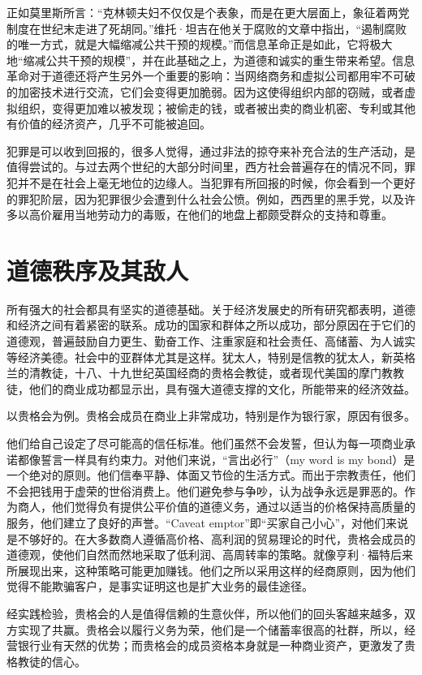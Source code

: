 正如莫里斯所言：“克林顿夫妇不仅仅是个表象，而是在更大层面上，象征着两党制度在世纪末走进了死胡同。”维托·坦吉在他关于腐败的文章中指出，“遏制腐败的唯一方式，就是大幅缩减公共干预的规模。”而信息革命正是如此，它将极大地“缩减公共干预的规模”，并在此基础之上，为道德和诚实的重生带来希望。信息革命对于道德还将产生另外一个重要的影响：当网络商务和虚拟公司都用牢不可破的加密技术进行交流，它们会变得更加脆弱。因为这使得组织内部的窃贼，或者虚拟组织，变得更加难以被发现；被偷走的钱，或者被出卖的商业机密、专利或其他有价值的经济资产，几乎不可能被追回。

犯罪是可以收到回报的，很多人觉得，通过非法的掠夺来补充合法的生产活动，是值得尝试的。与过去两个世纪的大部分时间里，西方社会普遍存在的情况不同，罪犯并不是在社会上毫无地位的边缘人。当犯罪有所回报的时候，你会看到一个更好的罪犯阶层，因为犯罪很少会遭到什么社会公愤。例如，西西里的黑手党，以及许多以高价雇用当地劳动力的毒贩，在他们的地盘上都颇受群众的支持和尊重。

\section{道德秩序及其敌人}
所有强大的社会都具有坚实的道德基础。关于经济发展史的所有研究都表明，道德和经济之间有着紧密的联系。成功的国家和群体之所以成功，部分原因在于它们的道德观，普遍鼓励自力更生、勤奋工作、注重家庭和社会责任、高储蓄、为人诚实等经济美德。社会中的亚群体尤其是这样。犹太人，特别是信教的犹太人，新英格兰的清教徒，十八、十九世纪英国经商的贵格会教徒，或者现代美国的摩门教教徒，他们的商业成功都显示出，具有强大道德支撑的文化，所能带来的经济效益。

以贵格会为例。贵格会成员在商业上非常成功，特别是作为银行家，原因有很多。

他们给自己设定了尽可能高的信任标准。他们虽然不会发誓，但认为每一项商业承诺都像誓言一样具有约束力。对他们来说，“言出必行”（my word is my bond）是一个绝对的原则。他们信奉平静、体面又节俭的生活方式。而出于宗教责任，他们不会把钱用于虚荣的世俗消费上。他们避免参与争吵，认为战争永远是罪恶的。作为商人，他们觉得负有提供公平价值的道德义务，通过以适当的价格保持高质量的服务，他们建立了良好的声誉。“Caveat emptor”即“买家自己小心”，对他们来说是不够好的。在大多数商人遵循高价格、高利润的贸易理论的时代，贵格会成员的道德观，使他们自然而然地采取了低利润、高周转率的策略。就像亨利·福特后来所展现出来，这种策略可能更加赚钱。他们之所以采用这样的经商原则，因为他们觉得不能欺骗客户，是事实证明这也是扩大业务的最佳途径。

经实践检验，贵格会的人是值得信赖的生意伙伴，所以他们的回头客越来越多，双方实现了共赢。贵格会以履行义务为荣，他们是一个储蓄率很高的社群，所以，经营银行业有天然的优势；而贵格会的成员资格本身就是一种商业资产，更激发了贵格教徒的信心。

